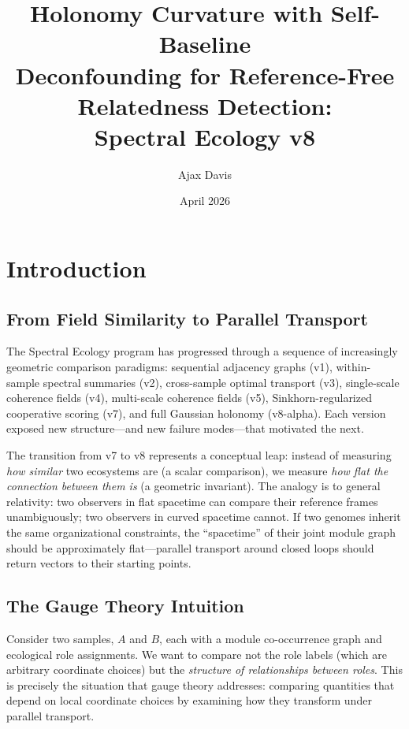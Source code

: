 \documentclass{../yalumba}
\title{Holonomy Curvature with Self-Baseline\\Deconfounding for Reference-Free\\Relatedness Detection:\\Spectral Ecology v8}
\author{Ajax Davis}
\date{April 2026}
\begin{document}
\maketitle

\tableofcontents
\newpage


\section{Introduction}
\label{sec:intro}

\subsection{From Field Similarity to Parallel Transport}

The Spectral Ecology program has progressed through a sequence of
increasingly geometric comparison paradigms: sequential adjacency graphs
(v1), within-sample spectral summaries (v2), cross-sample optimal transport
(v3), single-scale coherence fields (v4), multi-scale coherence fields (v5),
Sinkhorn-regularized cooperative scoring (v7), and full Gaussian holonomy
(v8-alpha).  Each version exposed new structure---and new failure modes---that
motivated the next.


The transition from v7 to v8 represents a conceptual leap: instead of
measuring \emph{how similar} two ecosystems are (a scalar comparison), we
measure \emph{how flat the connection between them is} (a geometric
invariant).  The analogy is to general relativity: two observers in flat
spacetime can compare their reference frames unambiguously; two observers
in curved spacetime cannot.  If two genomes inherit the same organizational
constraints, the ``spacetime'' of their joint module graph should be
approximately flat---parallel transport around closed loops should return
vectors to their starting points.

\subsection{The Gauge Theory Intuition}

Consider two samples, $A$ and $B$, each with a module co-occurrence graph
and ecological role assignments.  We want to compare not the role labels
(which are arbitrary coordinate choices) but the \emph{structure of
relationships between roles}.  This is precisely the situation that gauge
theory addresses: comparing quantities that depend on local coordinate
choices by examining how they transform under parallel transport.
\end{document}
